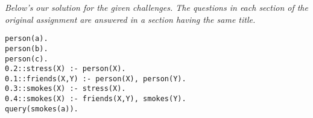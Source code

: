 \documentclass{res/theme}
\subtitle{Michiel Janssen \& Bruno Vandekerkhove}
\begin{document}
\maketitle
\tableofcontents

\vspace{0.2cm}
\begin{center}
\end{center}

%
%
\begin{center}
\textit{Below's our solution for the given challenges. The questions in each section of the original assignment are answered in a section having the same title.}
\end{center}

\vspace{0.0cm}
\begin{code}
\begin{verbatim}
person(a). 
person(b). 
person(c). 
0.2::stress(X) :- person(X). 
0.1::friends(X,Y) :- person(X), person(Y). 
0.3::smokes(X) :- stress(X). 
0.4::smokes(X) :- friends(X,Y), smokes(Y). 
query(smokes(a)).
\end{verbatim}
\label{code:base}
\end{code}

\begin{center}
\end{center}

\begin{multicols*}{2}
\raggedcolumns

%
% 


%
% 


%
% 


\end{multicols*}

%
%

\newpage
\appendix


% 
%

\newpage


\end{document}
